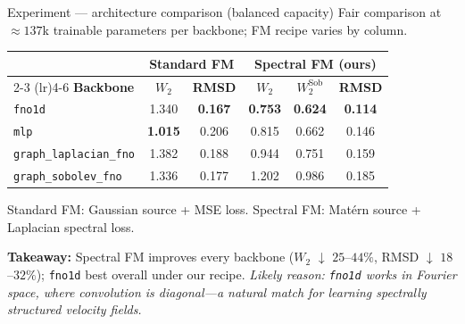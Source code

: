 \documentclass[aspectratio=169,11pt]{beamer}
\begin{document}

\begin{frame}{Experiment --- architecture comparison (balanced capacity)}
  \footnotesize
  Fair comparison at $\approx 137$k trainable parameters per backbone; FM recipe varies by column.

  \vspace{0.25em}
  \begin{table}
    \centering
    \setlength{\tabcolsep}{3.5pt}
    \begin{tabular}{@{}l cc ccc@{}}
      \toprule
      & \multicolumn{2}{c}{\textbf{Standard FM}} & \multicolumn{3}{c}{\textbf{Spectral FM (ours)}} \\
      \cmidrule(lr){2-3} \cmidrule(lr){4-6}
      \textbf{Backbone} &
      \textbf{$W_2$} & \textbf{RMSD} &
      \textbf{$W_2$} & \textbf{$W_2^{\mathrm{Sob}}$} & \textbf{RMSD} \\
      \midrule
      \texttt{fno1d} &
      1.340 & \textbf{0.167} &
      \textbf{0.753} & \textbf{0.624} & \textbf{0.114} \\
      \texttt{mlp} &
      \textbf{1.015} & 0.206 &
      0.815 & 0.662 & 0.146 \\
      \texttt{graph\_laplacian\_fno} &
      1.382 & 0.188 &
      0.944 & 0.751 & 0.159 \\
      \texttt{graph\_sobolev\_fno} &
      1.336 & 0.177 &
      1.202 & 0.986 & 0.185 \\
      \bottomrule
    \end{tabular}
  \end{table}

  \vspace{0.25em}
  \scriptsize
  Standard FM: Gaussian source + MSE loss.
  Spectral FM: Mat\'ern source + Laplacian spectral loss.

  \vspace{0.2em}
  \normalsize
  \textbf{Takeaway:} Spectral FM improves every backbone ($W_2$ $\downarrow$ $25$--$44\%$, RMSD $\downarrow$ $18$--$32\%$); \texttt{fno1d} best overall under our recipe.
  \textit{\scriptsize Likely reason: \texttt{fno1d} works in Fourier space, where convolution is diagonal---a natural match for learning spectrally structured velocity fields.}
\end{frame}
\end{document}
